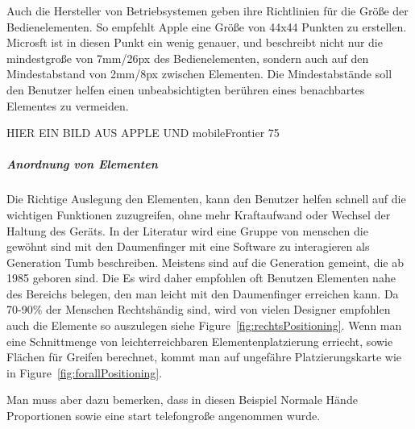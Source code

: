 Auch die Hersteller von Betriebsystemen geben ihre Richtlinien für die Größe der Bedienelementen. So empfehlt Apple eine Größe von 44x44 Punkten zu erstellen\cite{Apple}. Microsft ist in diesen Punkt ein wenig genauer, und beschreibt nicht nur die mindestgroße von 7mm/26px des Bedienelementen, sondern auch auf den Mindestabstand von 2mm/8px zwischen Elementen\cite{lukeGUI}. Die Mindestabstände soll den Benutzer helfen einen unbeabsichtigten berühren eines benachbartes Elementes zu vermeiden. 

HIER EIN BILD AUS APPLE UND mobileFrontier 75

\subparagraph{Anordnung von Elementen} 
\label{subp:anordnung_von_elementen}

Die Richtige Auslegung den Elementen, kann den Benutzer helfen schnell auf die wichtigen Funktionen zuzugreifen, ohne mehr Kraftaufwand oder Wechsel der Haltung des Geräts. In der Literatur wird eine Gruppe von menschen die gewöhnt sind mit den Daumenfinger mit eine Software zu interagieren als Generation Tumb beschreiben. Meistens sind auf die Generation gemeint, die ab 1985 geboren sind. Die  Es wird daher empfohlen oft Benutzen Elementen nahe des Bereichs belegen, den man leicht mit den Daumenfinger erreichen kann. Da 70-90\% der Menschen  Rechtshändig sind, wird von vielen Designer empfohlen auch die Elemente so auszulegen siehe Figure~\ref{fig:rechtsPositioning}. Wenn man eine Schnittmenge von leichterreichbaren Elementenplatzierung erriecht, sowie Flächen für Greifen berechnet, kommt man auf ungefähre Platzierungskarte wie in Figure~\ref{fig:forallPositioning}. 

Man muss aber dazu bemerken, dass in diesen Beispiel Normale Hände Proportionen sowie eine start telefongroße angenommen wurde.


